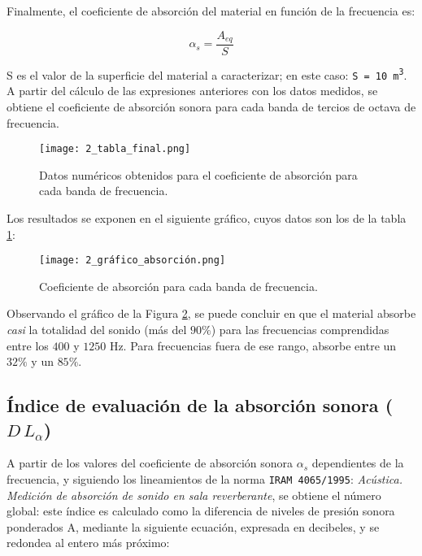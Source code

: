 		Finalmente, el coeficiente de absorción del material en función de la frecuencia es:
		
		\begin{equation}
			\alpha_s = \frac{A_{eq}}{S}
		\end{equation}
		
		S es el valor de la superficie del material a caracterizar; en este caso: \texttt{S = \SI{10}{\cubic\meter}}.\\

		A partir del cálculo de las expresiones anteriores con los datos medidos, se obtiene el coeficiente de absorción sonora para cada banda de tercios de octava de frecuencia.

		\begin{figure}[H]
			\centering
			\texttt{[image: 2\_tabla\_final.png]}\\
			\caption{Datos numéricos obtenidos para el coeficiente de absorción para cada banda de frecuencia.}
			\label{2_tabla_final}
		\end{figure}
		
		Los resultados se exponen en el siguiente gráfico, cuyos datos son los de la tabla \ref{2_tabla_final}:

		\begin{figure}[H]
			\centering
			\texttt{[image: 2\_gráfico\_absorción.png]}\\
			\caption{Coeficiente de absorción para cada banda de frecuencia.}
			\label{2_gráfico_absorción}
		\end{figure}
		
		Observando el gráfico de la Figura \ref{2_gráfico_absorción}, se puede concluir en que el material absorbe \textit{casi} la totalidad del sonido (más del $90 \%$) para las frecuencias comprendidas entre los $	400$ y $1250$ Hz. Para frecuencias fuera de ese rango, absorbe entre un $32 \%$ y un $85 \%$.
		
		\subsection{Índice de evaluación de la absorción sonora ($D\,L_\alpha$)}
		
		A partir de los valores del coeficiente de absorción sonora $\alpha_s$ dependientes de la frecuencia, y siguiendo los lineamientos de la norma \texttt{IRAM 4065/1995}: \textit{Acústica. Medición de absorción de sonido en sala reverberante}, se obtiene el número global: este índice es calculado como la diferencia de niveles de presión sonora ponderados A, mediante la siguiente ecuación, expresada en decibeles, y se redondea al entero más próximo:
	
